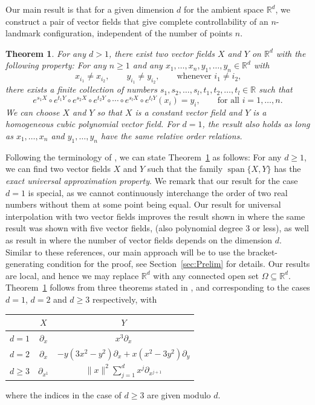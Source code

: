 \documentclass[10pt]{amsart}
\newcounter{dummy} \numberwithin{dummy}{section}
\newtheorem{theorem}[dummy]{Theorem}
\theoremstyle{remark}
\newcommand{\R}{\mathbb{R}}
\DeclareMathOperator{\spn}{span}
\numberwithin{equation}{section}
\begin{document}
Our main result is that for a given dimension $d$ for the ambient space $\R^d$, we construct a pair of vector fields that give complete controllability of an $n$-landmark configuration, independent of the number of points $n$.
\begin{theorem} \label{th:MAIN}
For any $d> 1$, there exist two vector fields $X$ and $Y$ on $\mathbb{R}^d$ with the following property: For any $n \geq 1$ and any $x_1, \dots, x_n, y_1, \dots, y_n \in \R^d$ with
$$x_{i_1} \neq x_{i_2}, \qquad y_{i_1} \neq y_{i_2}, \qquad \text{whenever $i_1 \neq i_2$,}$$
there exists a finite collection of numbers $s_1, s_2,\dots, s_l, t_1, t_2, \dots, t_l \in \R$ such that
$$e^{s_1 X} \circ e^{t_1 Y} \circ e^{s_2 X} \circ e^{t_2 Y} \circ \cdots \circ e^{s_l X} \circ e^{t_l Y}(x_i ) =y_i, \qquad \text{for all $i=1,\dots,n$.}$$
We can choose $X$ and $Y$ so that $X$ is a constant vector field and $Y$ is a homogeneous cubic polynomial vector field. For $d=1$, the result also holds as long as $x_1, \dots, x_n$ and $y_1, \dots, y_n$ have the same relative order relations.
\end{theorem}
Following the terminology of \cite{cuchiero2020deep}, we can state Theorem~\ref{th:MAIN} as follows: For any $d \geq 1$, we can find two vector fields $X$ and $Y$ such that the family $\spn \{X,Y\}$ has the \emph{exact universal approximation property}. We remark that our result for the case $d=1$ is special, as we cannot continuously interchange the order of two real numbers without them at some point being equal. Our result for universal interpolation with two vector fields improves the result shown in \cite{cuchiero2020deep} where the same result was shown with five vector fields, (also polynomial degree 3 or less), as well as result in \cite{AgSa22} where the number of vector fields depends on the dimension $d$. Similar to these references, our main approach will be to use the bracket-generating condition for the proof, see Section~\ref{sec:Prelim} for details. Our results are local, and hence we may replace $\mathbb{R}^d$ with any connected open set $\Omega \subseteq \mathbb{R}^d$. Theorem~\ref{th:MAIN} follows from three theorems stated in ,  and  corresponding to the cases $d =1$, $d=2$ and $d\geq 3$ respectively, with
\begin{center}
\begin{tabular}{l|c|c}
& $X$ & $Y$ \\ \hline 
$d=1$ & $\partial_x$ & $x^3 \partial_x$ \\
$d=2$ & $\partial_x$ & $-y(3x^2 -y^2) \partial_x + x(x^2 -3y^2) \partial_y$ \\
$d \geq 3$ & $\partial_{x^1}$ & $\|x\|^2 \sum_{j=1}^d x^j \partial_{x^{j+1}}$
\end{tabular}
\end{center}
where the indices in the case of $d \geq 3$ are given modulo $d$.
\end{document}
